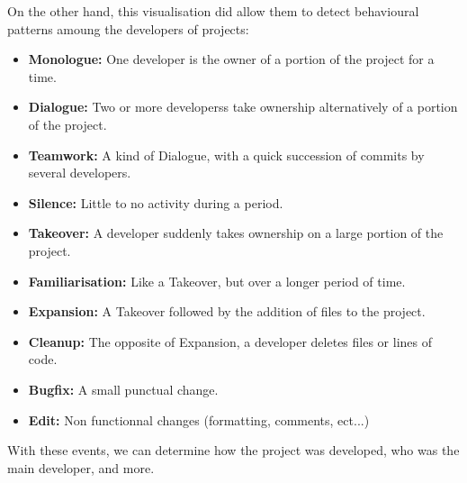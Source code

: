 On the other hand, this visualisation did allow them to detect behavioural patterns amoung the developers of projects:
\begin{itemize}
\item \textbf{Monologue:} One developer is the owner of a portion of the project for a time.
\item \textbf{Dialogue:} Two or more developerss take ownership alternatively of a portion of the project.
\item \textbf{Teamwork:} A kind of Dialogue, with a quick succession of commits by several developers.
\item \textbf{Silence:} Little to no activity during a period.
\item \textbf{Takeover:} A developer suddenly takes ownership on a large portion of the project.
\item \textbf{Familiarisation:} Like a Takeover, but over a longer period of time.
\item \textbf{Expansion:} A Takeover followed by the addition of files to the project.
\item \textbf{Cleanup:} The opposite of Expansion, a developer deletes files or lines of code.
\item \textbf{Bugfix:} A small punctual change.
\item \textbf{Edit:} Non functionnal changes (formatting, comments, ect...)
\end{itemize}

With these events, we can determine how the project was developed, who was the main developer, and more.